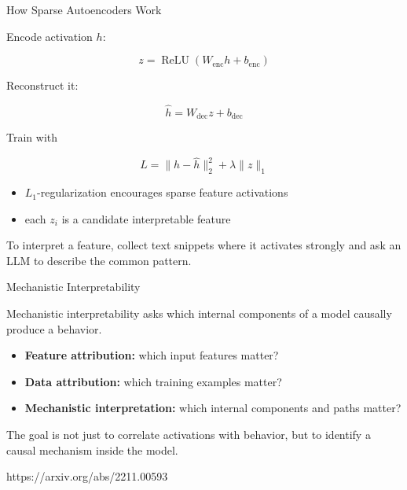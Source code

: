 \documentclass[11pt,compress,t,notes=noshow, xcolor=table]{beamer}
\begin{document}

\begin{vbframe}{How Sparse Autoencoders Work}

Encode activation \(h\):

\[
z = \operatorname{ReLU}(W_{\mathrm{enc}} h + b_{\mathrm{enc}})
\]

Reconstruct it:

\[
\hat h = W_{\mathrm{dec}} z + b_{\mathrm{dec}}
\]

Train with

\[
L = \|h-\hat h\|_2^2 + \lambda \|z\|_1
\]

\begin{itemize}
  \item \(L_1\)-regularization encourages sparse feature activations
  \item each \(z_i\) is a candidate interpretable feature
\end{itemize}

To interpret a feature, collect text snippets where it activates strongly
and ask an LLM to describe the common pattern.

\end{vbframe}


\begin{vbframe}{Mechanistic Interpretability}

Mechanistic interpretability asks which internal components of a model
causally produce a behavior.

\begin{itemize}
  \item \textbf{Feature attribution:} which input features matter?
  \item \textbf{Data attribution:} which training examples matter?
  \item \textbf{Mechanistic interpretation:} which internal components and paths matter?
\end{itemize}

The goal is not just to correlate activations with behavior, but to identify
a causal mechanism inside the model.

{https://arxiv.org/abs/2211.00593}

\end{vbframe}
\end{document}
